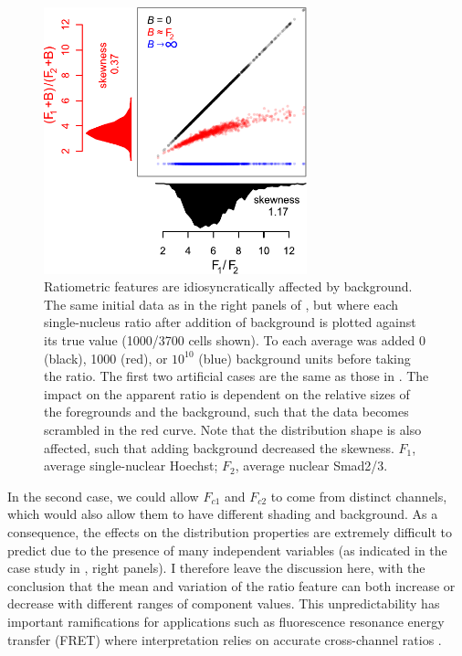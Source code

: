   \begin{figure}[!bt]
  \centering
  \includegraphics[width=3in]{FIGS/imaging/backgroundRatio.pdf}
  {\singlespacing 
  \caption[ Idiosyncratic effects of background on ratiometric features.]
            { Ratiometric features are idiosyncratically affected by background.
            The same initial data as in the right panels of ,
			but where each single-nucleus ratio
            after addition of background is plotted against its true value (1000/3700 cells shown).
            To each average was added 0 (black), 1000 (red),
            or $10^{10}$ (blue) background units before taking the ratio. The first
            two artificial cases are the same as those in .
			The impact on the apparent ratio
            is dependent on the relative sizes of the foregrounds and the background,
            such that the data becomes scrambled in the red curve.
            Note that
			the distribution shape is also affected, such that adding background
			decreased the skewness. $F_1$, average
            single-nuclear Hoechst; $F_2$, average nuclear Smad2/3.}
  \label{fig:imaging:backgroundRatio}}
  \end{figure}


In the second case, we could allow $F_{c1}$ and $F_{c2}$ to come
from distinct channels, which would also allow them to have
different shading
and background. As a consequence, the effects on the
distribution properties are extremely difficult to predict
due to the presence of many independent variables
(as indicated in the case study in , right panels).
I therefore leave the discussion here, with
the conclusion that the mean and variation of the ratio feature can both
increase or decrease with different ranges of component values.
This unpredictability has important
ramifications for applications such as
fluorescence resonance energy transfer (FRET) where interpretation
relies on accurate cross-channel ratios \cite{Hodgson2010}.


